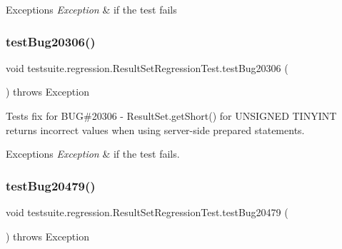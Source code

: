 \begin{DoxyExceptions}{Exceptions}
{\em Exception} & if the test fails \\
\hline
\end{DoxyExceptions}
\mbox{\label{classtestsuite_1_1regression_1_1_result_set_regression_test_a676f6934dd6986c57deb1da3920d7240}} 
\subsubsection{\texorpdfstring{test\+Bug20306()}{testBug20306()}}
{\footnotesize\ttfamily void testsuite.\+regression.\+Result\+Set\+Regression\+Test.\+test\+Bug20306 (\begin{DoxyParamCaption}{ }\end{DoxyParamCaption}) throws Exception}

Tests fix for B\+UG\#20306 -\/ Result\+Set.\+get\+Short() for U\+N\+S\+I\+G\+N\+ED T\+I\+N\+Y\+I\+NT returns incorrect values when using server-\/side prepared statements.


\begin{DoxyExceptions}{Exceptions}
{\em Exception} & if the test fails. \\
\hline
\end{DoxyExceptions}
\mbox{\label{classtestsuite_1_1regression_1_1_result_set_regression_test_ac51afa90e507daec20c3fe37a132b0de}} 
\subsubsection{\texorpdfstring{test\+Bug20479()}{testBug20479()}}
{\footnotesize\ttfamily void testsuite.\+regression.\+Result\+Set\+Regression\+Test.\+test\+Bug20479 (\begin{DoxyParamCaption}{ }\end{DoxyParamCaption}) throws Exception}

